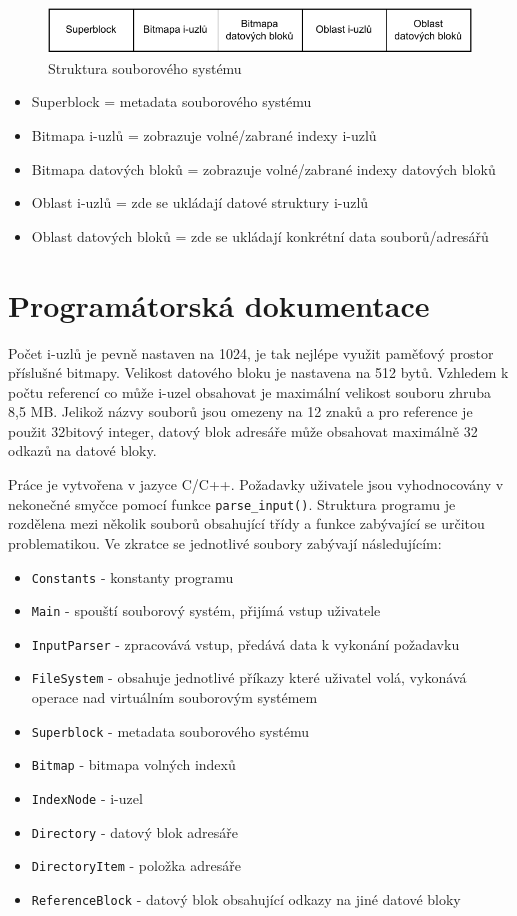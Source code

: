 \documentclass[12pt]{report}
\begin{document}
	\begin{figure}
		\centering
		\includegraphics[width=1\textwidth]{struktura}
		\caption{Struktura souborového systému}
		\label{fig:struktura}
	\end{figure}
	
	\begin{itemize}
		\item Superblock = metadata souborového systému
		\item Bitmapa i-uzlů = zobrazuje volné/zabrané indexy i-uzlů
		\item Bitmapa datových bloků = zobrazuje volné/zabrané indexy datových bloků
		\item Oblast i-uzlů = zde se ukládají datové struktury i-uzlů
		\item Oblast datových bloků = zde se ukládají konkrétní data souborů/adresářů
	\end{itemize}


	\chapter{Programátorská dokumentace}
	Počet i-uzlů je pevně nastaven na 1024, je tak nejlépe využit paměťový prostor příslušné bitmapy. Velikost datového bloku je nastavena na 512 bytů. Vzhledem k počtu referencí co může i-uzel obsahovat je maximální velikost souboru zhruba 8,5 MB. Jelikož názvy souborů jsou omezeny na 12 znaků a pro reference je použit 32bitový integer, datový blok adresáře může obsahovat maximálně 32 odkazů na datové bloky.
	
	Práce je vytvořena v jazyce C/C++. Požadavky uživatele jsou vyhodnocovány v nekonečné smyčce pomocí funkce \texttt{parse\_input()}. Struktura programu je rozdělena mezi několik souborů obsahující třídy a funkce zabývající se určitou problematikou. Ve zkratce se jednotlivé soubory zabývají následujícím:
	\begin{itemize}
		\item \texttt{Constants} - konstanty programu
		\item \texttt{Main} - spouští souborový systém, přijímá vstup uživatele
		\item \texttt{InputParser} - zpracovává vstup, předává data k vykonání požadavku
		\item \texttt{FileSystem} - obsahuje jednotlivé příkazy které uživatel volá, vykonává operace nad virtuálním souborovým systémem
		\item \texttt{Superblock} - metadata souborového systému
		\item \texttt{Bitmap} - bitmapa volných indexů
		\item \texttt{IndexNode} - i-uzel
		\item \texttt{Directory} - datový blok adresáře
		\item \texttt{DirectoryItem} - položka adresáře
		\item \texttt{ReferenceBlock} - datový blok obsahující odkazy na jiné datové bloky
	\end{itemize}
\end{document}
